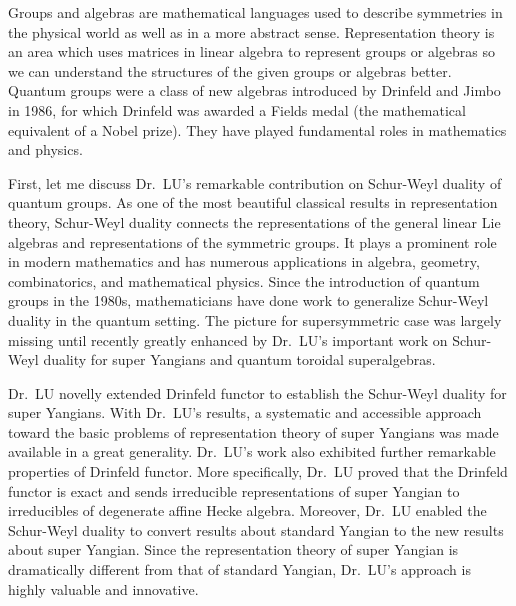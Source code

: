\documentclass[12pt]{amsart} %
\begin{document}
Groups and algebras are mathematical languages used to describe symmetries in the physical world as well as in a more abstract sense. Representation theory is an area which uses matrices in linear algebra to represent groups or algebras so we can understand the structures of the given groups or algebras better. Quantum groups were a class of new algebras introduced by Drinfeld and Jimbo in 1986, for which Drinfeld was awarded a Fields medal (the mathematical equivalent of a Nobel prize). They have played fundamental roles in mathematics and physics. 

First, let me discuss Dr.\ LU's remarkable contribution on Schur-Weyl duality of quantum groups. As one of the most beautiful classical results in representation theory, Schur-Weyl duality connects the representations of the general linear Lie algebras and representations of the symmetric groups. It plays a prominent role in modern mathematics and has numerous applications in algebra, geometry, combinatorics, and mathematical physics. Since the introduction of quantum groups in the 1980s, mathematicians have done work to generalize Schur-Weyl duality in the quantum setting. The picture for supersymmetric case was largely missing until recently greatly enhanced by Dr.\ LU's important work on Schur-Weyl duality for super Yangians and quantum toroidal superalgebras. 


Dr.\ LU novelly extended Drinfeld functor to establish the Schur-Weyl duality for super Yangians. With Dr.\ LU's results, a systematic and accessible approach toward the basic problems of representation theory of super Yangians was made available in a great generality. Dr.\ LU's work also exhibited further remarkable properties of Drinfeld functor. More specifically, Dr.\ LU proved that the Drinfeld functor is exact and sends irreducible representations of super Yangian to irreducibles of degenerate affine Hecke algebra. Moreover, Dr.\ LU enabled the Schur-Weyl duality to convert results about standard Yangian to the new results about super Yangian. Since the representation theory of super Yangian is dramatically different from that of standard Yangian, Dr.\ LU's approach is highly valuable and innovative. 
\end{document}

